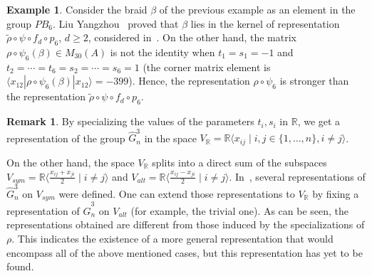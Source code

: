 \documentclass{article}
\theoremstyle{definition}
\newtheorem{remark}{Remark}
\newtheorem{example}{Example}
\begin{document}
\begin{example}
    Consider the braid $\beta$ of the previous example as an element in the group $PB_6$. Liu Yangzhou~\cite{Yangzhou} proved that $\beta$ lies in the kernel of representation $\tilde\rho\circ\psi\circ f_d\circ p_6$, $d\ge 2$, considered in~\cite{MN23}. On the other hand, the matrix $\rho\circ\psi_6(\beta)\in M_{30}(A)$ is not the identity when $t_1=s_1=-1$ and $t_2=\cdots=t_6=s_2=\cdots=s_6=1$ (the corner matrix element is $\langle x_{12}|\rho\circ\psi_6(\beta)|x_{12}\rangle=-399$). Hence, the representation $\rho\circ\psi_6$ is stronger than the representation $\tilde\rho\circ\psi\circ f_d\circ p_6$.
\end{example}

\begin{remark}
    By specializing the values of the parameters $t_i,s_i$ in $\mathbb R$, we get a representation of the group $\hat G^3_n$ in the space $V_{\mathbb R}=\mathbb R\langle x_{ij}\mid i,j\in\{1,\dots,n\}, i\ne j\rangle$.  
    
    On the other hand, the space $V_{\mathbb R}$ splits into a direct sum of the subspaces $V_{sym}=\mathbb R\langle \frac{x_{ij}+x_{ji}}2\mid i\ne j\rangle$ and $V_{alt}=\mathbb R\langle \frac{x_{ij}-x_{ji}}2\mid i\ne j\rangle$. In~\cite[Section 2.3]{FKM}, several representations of $\hat G^3_n$ on $V_{sym}$ were defined. One can extend those representations to $V_{\mathbb R}$ by fixing a representation of $\hat G^3_n$ on $V_{alt}$ (for example, the trivial one). As can be seen, the representations obtained are different from those induced by the specializations of $\rho$. This indicates the existence of a more general representation that would encompass all of the above mentioned cases, but this representation has yet to be found. 
\end{remark}
\end{document}
